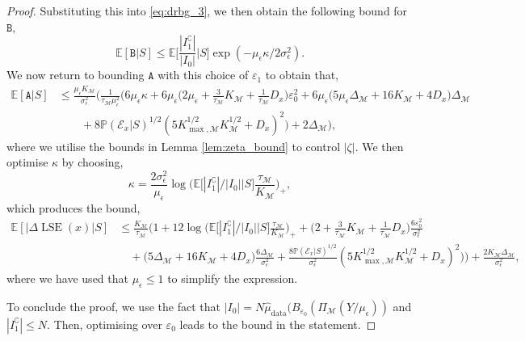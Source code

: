 \documentclass[10pt,a4paper]{amsart}
\newcommand{\E}{\mathbb{E}}
\newcommand{\M}{{\mathcal{M}}}
\newcommand{\gap}{\Delta_\M}
\newcommand{\lse}{\operatorname{LSE}}
\newcommand{\prob}{\mathbb{P}}
\begin{document}
\begin{proof}
Substituting this into \eqref{eq:drbg_3}, we then obtain the following bound for \(\mathtt{B}\),
\begin{equation*}
    \E[\mathtt{B}|S] \leq \E \bigg [ \frac{|I_1^\complement|}{|I_0|} \bigg | S \bigg ] \exp(-\mu_\epsilon\kappa/2\sigma^2_\epsilon).
\end{equation*}
We now return to bounding \(\mathtt{A}\) with this choice of \(\varepsilon_1\)
to obtain that,
\begin{align*}
    \E[\mathtt{A}|S] &\leq \frac{\mu_\epsilon K_\M}{\sigma^2_\epsilon} \bigg ( \frac{1}{\tau_\M \mu_\epsilon^2} \bigg ( 6 \mu_\epsilon \kappa + 6 \mu_\epsilon \Big ( 2\mu_\epsilon + \tfrac{3}{\tau_\M} K_\M + \tfrac{1}{\tau_\M} D_x \Big ) \varepsilon_0^2 + 6 \mu_\epsilon \Big ( 5 \mu_\epsilon \gap + 16 K_\M + 4 D_x \Big ) \gap \\
    & \qquad + 8 \prob(\mathcal{E}_x|S)^{1/2} (5 K_{\max, \M}^{1/2} K_\M^{1/2} + D_x)^2 \bigg ) + 2 \gap \bigg ),
\end{align*}
where we utilise the bounds in Lemma \ref{lem:zeta_bound} to control \(|\zeta|\).
We then optimise \(\kappa\) by choosing,
\begin{equation*}
    \kappa = \frac{2 \sigma_\epsilon^2}{\mu_\epsilon} \log \bigg ( \E \Big [ |I_1^\complement|/|I_0| \Big | S \Big ] \frac{\tau_\M}{K_\M} \bigg )_+,
\end{equation*}
which produces the bound,
\begin{align*}
    \E[|\Delta \lse(x)|S] &\leq \frac{K_\M}{\tau_\M} \bigg ( 1 + 12 \log \Big ( \E \Big [ |I_1^\complement|/|I_0| \Big | S \Big ] \tfrac{\tau_\M}{K_\M} \Big )_+ + \Big ( 2 + \tfrac{3}{\tau_\M} K_\M + \tfrac{1}{\tau_\M} D_x \Big ) \frac{6\varepsilon_0^2}{\sigma_\epsilon^2} \\
    & \quad + \Big ( 5 \gap + 16 K_\M + 4 D_x \Big ) \frac{6 \gap}{\sigma_\epsilon^2} +\frac{8 \prob(\mathcal{E}_x|S)^{1/2}}{\sigma_\epsilon^2} (5 K_{\max, \M}^{1/2} K_\M^{1/2} + D_x)^2 \bigg ) \bigg ) + \frac{2 K_\M \gap}{\sigma_\epsilon^2},
\end{align*}
where we have used that \(\mu_\epsilon \leq 1\) to simplify the expression.

To conclude the proof, we use the fact that \(|I_0| = N \hat{\mu}_{\operatorname{data}}(B_{\varepsilon_0}(\Pi_\M(Y/\mu_\epsilon))\) and \(|I_1^\complement| \leq N\). Then, optimising over \(\varepsilon_0\) leads to the bound in the statement.
\end{proof}
\end{document}
